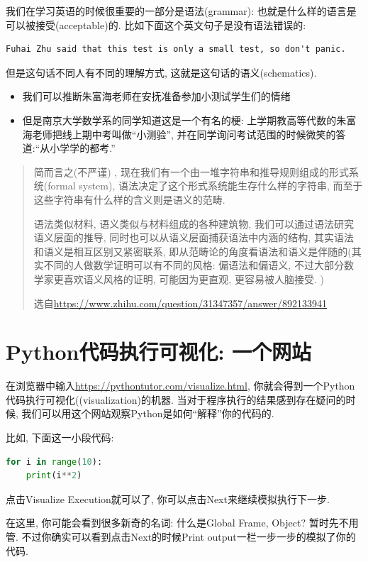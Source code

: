 我们在学习英语的时候很重要的一部分是语法(grammar): 也就是什么样的语言是可以被接受(acceptable)的. 比如下面这个英文句子是没有语法错误的: 
\begin{verbatim}
Fuhai Zhu said that this test is only a small test, so don't panic.
\end{verbatim}
但是这句话不同人有不同的理解方式, 这就是这句话的语义(schematics). 
\begin{itemize}
\item 我们可以推断朱富海老师在安抚准备参加小测试学生们的情绪
\item 但是南京大学数学系的同学知道这是一个有名的梗: 上学期教高等代数的朱富海老师把线上期中考叫做``小测验'', 并在同学询问考试范围的时候微笑的答道:``从小学学的都考.''
\end{itemize}
\begin{quote}
简而言之(不严谨) , 现在我们有一个由一堆字符串和推导规则组成的形式系统(formal system), 语法决定了这个形式系统能生存什么样的字符串, 而至于这些字符串有什么样的含义则是语义的范畴.

语法类似材料, 语义类似与材料组成的各种建筑物, 我们可以通过语法研究语义层面的推导, 同时也可以从语义层面捕获语法中内涵的结构,
其实语法和语义是相互区别又紧密联系, 即从范畴论的角度看语法和语义是伴随的(其实不同的人做数学证明可以有不同的风格: 偏语法和偏语义,
不过大部分数学家更喜欢语义风格的证明, 可能因为更直观, 更容易被人脑接受. ) 

选自\url{https://www.zhihu.com/question/31347357/answer/892133941}
\end{quote}

\section{Python代码执行可视化: 一个网站}

\begin{tool}
在浏览器中输入\url{https://pythontutor.com/visualize.html}, 你就会得到一个Python代码执行可视化((visualization)的机器. 当对于程序执行的结果感到存在疑问的时候, 我们可以用这个网站观察Python是如何``解释''你的代码的.

比如, 下面这一小段代码: 
\begin{lstlisting}[language=python]
for i in range(10):
    print(i**2)
\end{lstlisting}

点击Visualize Execution就可以了, 你可以点击Next来继续模拟执行下一步.

在这里, 你可能会看到很多新奇的名词: 什么是Global Frame, Object? 暂时先不用管. 不过你确实可以看到点击Next的时候Print output一栏一步一步的模拟了你的代码. 
\end{tool}

